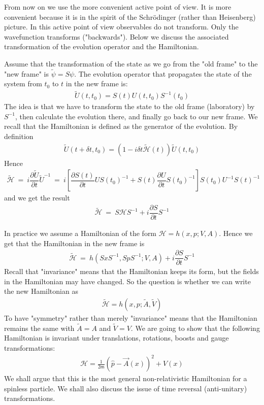 \documentclass[onecolumn,fleqn]{revtex4}
\newcommand{\mass}{\mathsf{m}}
\newcommand{\beq}{\begin{eqnarray}}
\newcommand{\eeq}{\end{eqnarray}}
\begin{document}
From now on we use the more convenient 
active point of view. It is more convenient 
because it is in the spirit of the Schr\"{o}dinger 
(rather than Heisenberg) picture. In this 
active point of view observables do not transform. 
Only the wavefunction transforms ("backwards").     
Below we discuss the associated 
transformation of the evolution operator 
and the Hamiltonian. 

Assume that the transformation of the state 
as we go from the "old frame" to the "new frame" is 
$\tilde{\psi}=S\psi$. The evolution operator that 
propagates the state of the system from $t_{0}$ to $t$ 
in the new frame is: 
\beq
\tilde{U}(t,t_{0})=S(t)U(t,t_{0})S^{-1}(t_{0})
\eeq
The idea is that we have to transform the state 
to the old frame (laboratory) by $S^{-1}$, 
then calculate the evolution there, 
and finally go back to our new frame.
We recall that the Hamiltonian is defined as the 
generator of the evolution. By definition 
\beq
\tilde{U}(t+\delta t,t_{0})=(1-i\delta t \tilde{\mathcal{H}}(t) ) \tilde{U}(t,t_{0})
\eeq
Hence 
\beq
\tilde{\mathcal{H}} \ = \ i\dfrac{\partial \tilde{U}}{\partial t}\tilde{U}^{-1} 
\ = \ 
i\left[ 
\dfrac{\partial S\left( t\right) }{\partial t}US\left( t_{0}\right) ^{-1}
+S(t) \dfrac{\partial U}{\partial t} S(t_{0})^{-1} \right] 
S(t_{0}) U^{-1}S(t)^{-1}
\eeq
and we get the result
\beq
\tilde{\mathcal{H}} \ = \ S \mathcal{H} S^{-1} + i \dfrac{\partial S}{\partial t} S^{-1}
\eeq



In practice we assume a Hamiltonian of the form $\mathcal{H}=h(x,p;V,A)$.  
Hence we get that the Hamiltonian in the new frame is 
\beq
\tilde{\mathcal{H}} \ = \  h(SxS^{-1},SpS^{-1};V,A)  + i \dfrac{\partial S}{\partial t} S^{-1}
\eeq
Recall that "invariance" means that the Hamiltonian 
keeps its form, but the fields in the 
Hamiltonian may have changed. So the question is 
whether we can write the new Hamiltonian as   
\beq
\tilde{\mathcal{H}} = h(x,p;\tilde{A},\tilde{V})
\eeq
To have "symmetry" rather than merely "invariance" 
means that the Hamiltonian remains the same 
with $\tilde{A}=A$ and $\tilde{V}=V$.    
We are going to show that the following Hamiltonian 
is invariant under translations, rotations, boosts and gauge transformations:
\beq
\mathcal{H} = \frac{1}{2\mass} \left( \hat{p}-\vec{A}(x) \right)^{2}+ V(x)
\eeq
We shall argue that this is the most general 
non-relativistic Hamiltonian for a spinless particle.
We shall also discuss the issue of time reversal 
(anti-unitary) transformations.     
\end{document}

